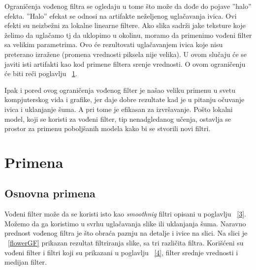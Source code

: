 \documentclass[a4paper,12pt,titlepage]{article}
\begin{document}
Ograničenja vođenog filtra se ogledaju u tome što može da dođe do pojave ''halo'' efekta. ''Halo'' efekat se odnosi na artifakte neželjenog uglačavanja ivica. Ovi efekti su neizbežni za lokalne linearne filtere. Ako slika sadrži jake teksture koje želimo da uglačamo tj da uklopimo u okolinu, moramo da primenimo vođeni filter sa velikim parametrima. Ovo će rezultovati uglačavanjem ivica koje nisu preterano izražene (promena vrednosti piksela nije velika). U ovom slučaju će se javiti isti artifakti kao kod primene filtera srenje vrednosti. O ovom ograničenju će biti reči poglavlju ~\ref{5}.

Ipak i pored ovog ograničenja vođenog filter je našao veliku primenu u svetu kompjuterskog vida i grafike, jer daje dobre rezultate kad je u pitanju očuvanje ivica i uklanjanje šuma. A pri tome je efikasan za izvršavanje. Pošto lokalni model, koji se koristi za vođeni filter, tip nenadgledanog učenja, ostavlja se prostor za primenu poboljšanih modela kako bi se stvorili novi filtri.  

\section{Primena}\label{5}%

\subsection{Osnovna primena}%

Vođeni filter može da se koristi isto kao \emph{smoothnig} filtri opisani u  poglavlju ~\ref{3}. Možemo da ga koristimo u svrhu uglačavanja slike ili uklanjanja šuma. Naravno prednost vođenog filtra je što obraća paznju na detalje i ivice na slici. Na slici je ~\ref{flowerGF} prikazan rezultat filtriranja slike, sa tri različita filtra. Korišćeni su vođeni filter i filtri koji su prikazani u poglavlju ~\ref{4}, filter srednje vrednosti i medijan filter. 
\end{document}
